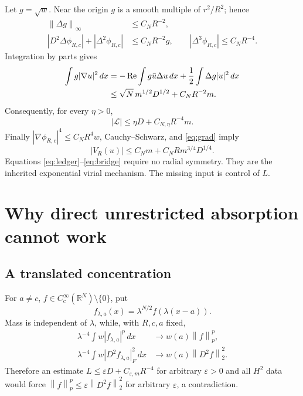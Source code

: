 \documentclass[11pt,a4paper]{article}
\theoremstyle{remark}\newtheorem{remark}[theorem]{Remark}
\newcommand{\R}{\mathbb R}
\newcommand{\dd}{\,dx}
\newcommand{\norm}[1]{\left\|#1\right\|}
\DeclareMathOperator{\Rea}{Re}
\begin{document}
Let $g=\sqrt w$. Near the origin $g$ is a smooth multiple of $r^2/R^2$; hence
\begin{align*}
 \norm{\Delta g}_\infty&\le C_NR^{-2},\\
 |D^2\Delta\phi_{R,c}|+|\Delta^2\phi_{R,c}|&\le C_NR^{-2}g,
 \qquad |\Delta^3\phi_{R,c}|\le C_NR^{-4}.
\end{align*}
Integration by parts gives
\begin{align}
 \int g|\nabla u|^2\dd
 &=-\Rea\int g\bar u\Delta u\dd+\frac12\int\Delta g|u|^2\dd\notag\\
 &\le\sqrt N\,m^{1/2}D^{1/2}+C_NR^{-2}m.\label{eq:grad}
\end{align}
Consequently, for every $\eta>0$,
\begin{equation}\label{eq:lower}
 |\mathcal L|\le\eta D+C_{N,\eta}R^{-4}m.
\end{equation}
Finally $|\nabla\phi_{R,c}|^4\le C_NR^4w$, Cauchy--Schwarz, and \eqref{eq:grad} imply
\begin{equation}\label{eq:bridge}
 |V_R(u)|\le C_Nm+C_NR m^{3/4}D^{1/4}.
\end{equation}
Equations \eqref{eq:ledger}--\eqref{eq:bridge} require no radial symmetry. They are the inherited exponential virial mechanism. The missing input is control of $L$.

\section{Why direct unrestricted absorption cannot work}
\subsection{A translated concentration}
For $a\ne c$, $f\in C_c^\infty(\R^N)\setminus\{0\}$, put
\[
 f_{\lambda,a}(x)=\lambda^{N/2}f(\lambda(x-a)).
\]
Mass is independent of $\lambda$, while, with $R,c,a$ fixed,
\begin{align*}
 \lambda^{-4}\int w|f_{\lambda,a}|^p\dd&\longrightarrow w(a)\norm f_p^p,\\
 \lambda^{-4}\int w|D^2f_{\lambda,a}|_F^2\dd&\longrightarrow w(a)\norm{D^2f}_2^2.
\end{align*}
Therefore an estimate $L\le\varepsilon D+C_{\varepsilon,m}R^{-4}$ for arbitrary $\varepsilon>0$ and all $H^2$ data would force
$\norm f_p^p\le\varepsilon\norm{D^2f}_2^2$ for arbitrary $\varepsilon$, a contradiction.
\end{document}
